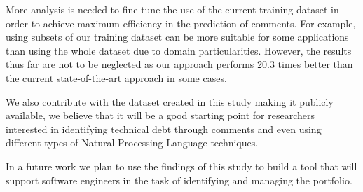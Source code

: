 More analysis is needed to fine tune the use of the current training dataset in order to achieve maximum efficiency in the prediction of \SATD comments. For example, using subsets of our training dataset can be more suitable for some applications than using the whole dataset due to domain particularities. However, the results thus far are not to be neglected as our approach performs 20.3 times better than the current state-of-the-art approach in some cases.

We also contribute with the dataset created in this study making it publicly available, we believe that it will be a good starting point for researchers interested in identifying technical debt through comments and even using different types of Natural Processing Language techniques. 

In a future work we plan to use the findings of this study to build a tool that will support software engineers in the task of identifying and managing the \SATD portfolio. 
